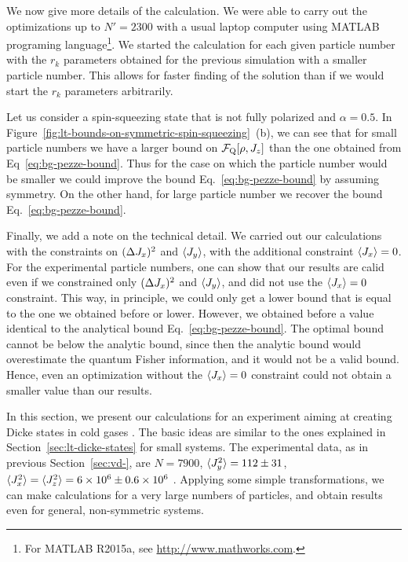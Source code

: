 We now give more details of the calculation. We were able to carry out the optimizations up to $N'=2300$ with a usual laptop computer using MATLAB programing language\footnote{For MATLAB R2015a, see \url{http://www.mathworks.com}.}.
We started the calculation for each given particle number with the $r_k$ parameters obtained for the previous simulation with a smaller particle number.
This allows for faster finding of the solution than if we would start the $r_k$ parameters arbitrarily.

Let us consider a spin-squeezing state that is not fully polarized and $\alpha=0.5$.
In Figure~\ref{fig:lt-bounds-on-symmetric-spin-squeezing}~(b), we can see that for small particle numbers we have a larger bound on $\mathcal{F}_{\textnormal{Q}}[\rho, J_z]$ than the one obtained from Eq~\eqref{eq:bg-pezze-bound}.
Thus for the case on which the particle number would be smaller we could improve the bound Eq.~\eqref{eq:bg-pezze-bound} by assuming symmetry.
On the other hand, for large particle number we recover the bound Eq.~\eqref{eq:bg-pezze-bound}.

Finally, we add a note on the technical detail.
We carried out our calculations with the constraints on $(\Delta J_x )^2$ and $\langle J_y \rangle$, with the additional constraint $\langle J_x \rangle=0$.
For the experimental particle numbers, one can show that our results are calid even if we constrained only $(\Delta J_x )^2$ and $\langle J_y \rangle$, and did not use the $\langle J_x \rangle=0$ constraint.
This way, in principle, we could only get a lower bound that is equal to the one we obtained before or lower.
However, we obtained before a value identical to the analytical bound Eq.~\eqref{eq:bg-pezze-bound}.
The optimal bound cannot be below the analytic bound, since then the analytic bound would overestimate the quantum Fisher information, and it would not be a valid bound.
Hence, even an optimization without the $\langle J_x \rangle=0$ constraint could not obtain a smaller value than our results.


In this section, we present our calculations for an experiment aiming at creating Dicke states in cold gases \citep{Luecke2014}.
The basic ideas are similar to the ones explained in Section~\ref{sec:lt-dicke-states} for small systems.
The experimental data, as in previous Section~\ref{sec:vd-}, are $N=7900$, $\langle J_y^2 \rangle=112\pm31$, $\langle J_x^2 \rangle=\langle J_z^2 \rangle=6\times10^6\pm0.6\times10^6$ \citep{Apellaniz2015}.
Applying some simple transformations, we can make calculations for a very large numbers of particles, and obtain results even for general, non-symmetric systems.

